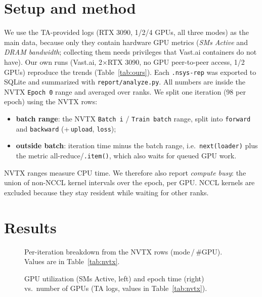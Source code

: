 \documentclass[11pt,a4paper]{article}
\begin{document}
\section{Setup and method}

We use the TA-provided logs (RTX 3090, 1/2/4 GPUs, all three modes) as the main data, because only they contain hardware GPU metrics
(\emph{SMs Active} and \emph{DRAM bandwidth}; collecting them needs privileges that Vast.ai containers do not have). Our own runs
(Vast.ai, 2$\times$RTX 3090, no GPU peer-to-peer access, 1/2 GPUs) reproduce the trends (Table~\ref{tab:ours}). Each \texttt{.nsys-rep} was exported to SQLite and
summarized with \texttt{report/analyze.py}. All numbers are inside the NVTX \texttt{Epoch 0} range and averaged over ranks. We split one iteration (98 per epoch) using the NVTX rows:
\begin{itemize}
\item \textbf{batch range}: the NVTX \texttt{Batch i} / \texttt{Train batch} range, split into \texttt{forward} and \texttt{backward} (+\,\texttt{upload}, \texttt{loss});
\item \textbf{outside batch}: iteration time minus the batch range, i.e.\ \texttt{next(loader)} plus the metric all-reduce/\texttt{.item()}, which also waits for queued GPU work.
\end{itemize}
NVTX ranges measure CPU time. We therefore also report \emph{compute busy}: the union of non-NCCL kernel intervals over the epoch, per GPU.
NCCL kernels are excluded because they stay resident while waiting for other ranks.

\section{Results}

\begin{figure}[h]
\centering

\caption{Per-iteration breakdown from the NVTX rows (mode\,/\,\#GPU). Values are in Table~\ref{tab:nvtx}.}
\label{fig:nvtx}
\end{figure}

\begin{table}[h]
\centering\small
\caption{NVTX breakdown and GPU metrics (TA logs, mean over GPUs). Busy = compute-kernel busy time over the epoch.}
\label{tab:nvtx}

\end{table}

\begin{figure}[h]
\centering

\caption{GPU utilization (SMs Active, left) and epoch time (right) vs.\ number of GPUs (TA logs, values in Table~\ref{tab:nvtx}).}
\label{fig:scaling}
\end{figure}
\end{document}
